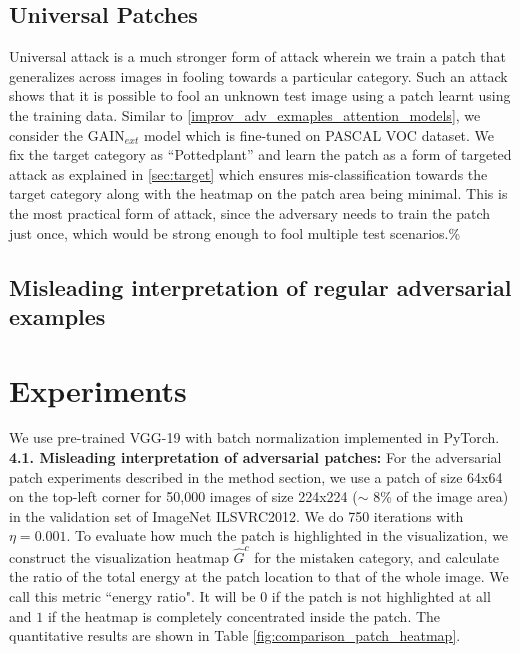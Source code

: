 \documentclass[10pt,twocolumn,letterpaper]{article}
\begin{document}
\subsection{Universal Patches}
\label{universal_attention}
Universal attack is a much stronger form of attack wherein we train a patch that generalizes across images in fooling towards a particular category. Such an attack shows that it is possible to fool an unknown test image using a patch learnt using the training data. Similar to \ref{improv_adv_exmaples_attention_models}, we consider the GAIN$_{ext}$ model which is fine-tuned on PASCAL VOC dataset. We fix the target category as ``Pottedplant'' and learn the patch as a form of targeted attack as explained in \ref{sec:target} which ensures mis-classification towards the target category along with the heatmap on the patch area being minimal. This is the most practical form of attack, since the adversary needs to train the patch just once, which would be strong enough to fool multiple test scenarios.\%\subsection{Misleading interpretation of regular adversarial examples}





















\section{Experiments}
 We use pre-trained VGG-19 \cite{simonyan2014very} with batch normalization implemented in PyTorch.\\



{\bf 4.1. Misleading interpretation of adversarial patches:}
\label{exp_misleading_adv_patches}
For the adversarial patch experiments described in the method section, we use a patch of size 64x64 on the top-left corner for 50,000 images of size 224x224 ($\sim$ 8\% of the image area) in the validation set of ImageNet \cite{deng2009imagenet} ILSVRC2012. We do 750 iterations with $\eta = 0.001$. To evaluate how much the patch is highlighted in the visualization, we construct the visualization heatmap $\hat{G}^c$ for the mistaken category, and calculate the ratio of the total energy at the patch location to that of the whole image. We call this metric ``energy ratio". It will be $0$ if the patch is not highlighted at all and $1$ if the heatmap is completely concentrated inside the patch. The quantitative results are shown in Table \ref{fig:comparison_patch_heatmap}.
\end{document}
